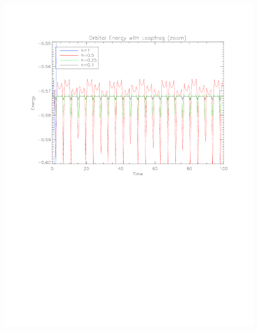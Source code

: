 \documentclass[11pt]{article}
\begin{document}
\begin{figure}
\centering
\includegraphics[scale = 0.7]{LFEnzoom.pdf}
\caption{}
\end{figure}
\end{document}
